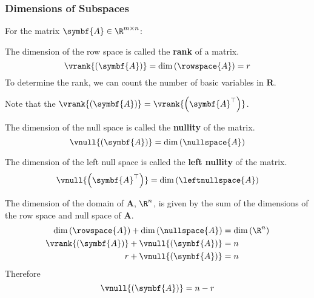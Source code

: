 \documentclass{article}
\begin{document}
\subsubsection{Dimensions of Subspaces}
For the matrix \(\symbf{A} \in \R^{m \times n}\):
\begin{definition}[Rank]
    The dimension of the row space is called the \textbf{rank} of a matrix.
    \begin{equation*}
        \vrank{\left( \symbf{A} \right)} = \dim{\left( \rowspace{A} \right)} = r
    \end{equation*}
    To determine the rank, we can count the number of basic variables in \(\symbf{R}\).

    Note that the \(\vrank{\left( \symbf{A} \right)} = \vrank{\left( \symbf{A}^\top \right)}\).
\end{definition}
\begin{definition}[Nullity]
    The dimension of the null space is called the \textbf{nullity} of the matrix.
    \begin{equation*}
        \vnull{\left( \symbf{A} \right)} = \dim{\left( \nullspace{A} \right)}
    \end{equation*}
\end{definition}
\begin{definition}
    The dimension of the left null space is called the \textbf{left nullity} of the matrix.
    \begin{equation*}
        \vnull{\left( \symbf{A}^\top \right)} = \dim{\left( \leftnullspace{A} \right)}
    \end{equation*}
\end{definition}
\begin{theorem}
    The dimension of the domain of \(\symbf{A}\), \(\R^n\), is given by
    the sum of the dimensions of the row space and null space of \(\symbf{A}\).
    \begin{align*}
        \dim{\left( \rowspace{A} \right)} + \dim{\left( \nullspace{A} \right)} & = \dim{\left( \R^n \right)} \\
        \vrank{\left( \symbf{A} \right)} + \vnull{\left( \symbf{A} \right)}    & = n                         \\
        r + \vnull{\left( \symbf{A} \right)}                                   & = n
    \end{align*}
    Therefore
    \begin{equation*}
        \vnull{\left( \symbf{A} \right)} = n - r
    \end{equation*}
\end{theorem}
\end{document}
